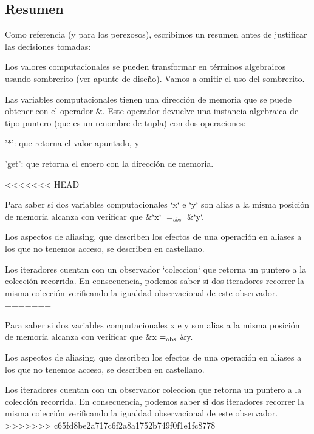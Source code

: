 \hypertarget{Aliasing_sec-Resumen}{}\subsection{\-Resumen}\label{Aliasing_sec-Resumen}
\-Como referencia (y para los perezosos), escribimos un resumen antes de justificar las decisiones tomadas\-:
\begin{DoxyItemize}
\item \-Los valores computacionales se pueden transformar en términos algebraicos usando sombrerito (ver apunte de diseño). \-Vamos a omitir el uso del sombrerito.
\item \-Las variables computacionales tienen una dirección de memoria que se puede obtener con el operador \&. \-Este operador devuelve una instancia algebraica de tipo puntero (que es un renombre de tupla) con dos operaciones\-:
\begin{DoxyEnumerate}
\item '$\ast$'\-: que retorna el valor apuntado, y
\item 'get'\-: que retorna el entero con la dirección de memoria.
\end{DoxyEnumerate}
<<<<<<< HEAD
\item \-Para saber si dos variables computacionales `x` e `y` son alias a la misma posición de memoria alcanza con verificar que \&`x` $=_{obs}$ \&`y`.
\item \-Los aspectos de aliasing, que describen los efectos de una operación en aliases a los que no tenemos acceso, se describen en castellano.
\item \-Los iteradores cuentan con un observador `coleccion` que retorna un puntero a la colección recorrida. \-En consecuencia, podemos saber si dos iteradores recorrer la misma colección verificando la igualdad observacional de este observador.
=======
\item Para saber si dos variables computacionales {\ttfamily x} e {\ttfamily y} son alias a la misma posición de memoria alcanza con verificar que \&{\ttfamily x} $=_{\rm obs}$ \&{\ttfamily y}.
\item Los aspectos de aliasing, que describen los efectos de una operación en aliases a los que no tenemos acceso, se describen en castellano.
\item Los iteradores cuentan con un observador {\ttfamily coleccion} que retorna un puntero a la colección recorrida. En consecuencia, podemos saber si dos iteradores recorrer la misma colección verificando la igualdad observacional de este observador.
>>>>>>> c65fd8be2a717c6f2a8a1752b749f0f1e1fc8778
\end{DoxyItemize}

